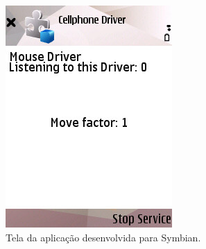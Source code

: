 \begin{figure}[h]
	\centering
	\begin{minipage}[t]{0.30\linewidth}
		\includegraphics[width=\linewidth]{imagens/printscreen_n95}
		\caption{Tela da aplicação desenvolvida para Symbian.}
		\label{fig:printscreen_symbian}
	\end{minipage}
	\hfill
	\begin{minipage}[t]{0.30\linewidth}

\end{minipage}
\end{figure}
